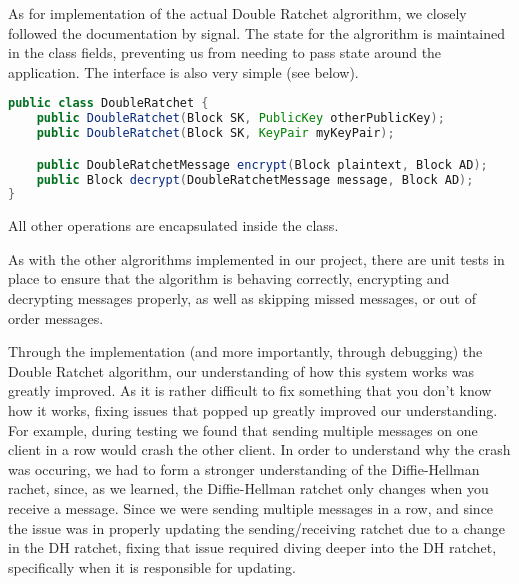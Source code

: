 As for implementation of the actual Double Ratchet algrorithm, we closely followed the documentation by signal.
The state for the algrorithm is maintained in the class fields, preventing us from needing to pass state around the application.
The interface is also very simple (see below).
\begin{lstlisting}[language=Java]
public class DoubleRatchet {
    public DoubleRatchet(Block SK, PublicKey otherPublicKey);
    public DoubleRatchet(Block SK, KeyPair myKeyPair);

    public DoubleRatchetMessage encrypt(Block plaintext, Block AD);
    public Block decrypt(DoubleRatchetMessage message, Block AD);
}
\end{lstlisting}
All other operations are encapsulated inside the class.

As with the other algrorithms implemented in our project, there are unit tests 
in place to ensure that the algorithm is behaving correctly, encrypting and decrypting 
messages properly, as well as skipping missed messages, or out of order messages.

Through the implementation (and more importantly, through debugging) the Double Ratchet algorithm, our understanding 
of how this system works was greatly improved. As it is rather difficult to fix something that you don't know how it 
works, fixing issues that popped up greatly improved our understanding. For example, during testing we found that 
sending multiple messages on one client in a row would crash the other client. In order to understand why the crash was occuring,
we had to form a stronger understanding of the Diffie-Hellman rachet, since, as we learned, the Diffie-Hellman ratchet only changes 
when you receive a message. Since we were sending multiple messages in a row, and since the issue was in properly updating the 
sending/receiving ratchet due to a change in the DH ratchet, fixing that issue required diving deeper into the DH ratchet, specifically when
it is responsible for updating.
